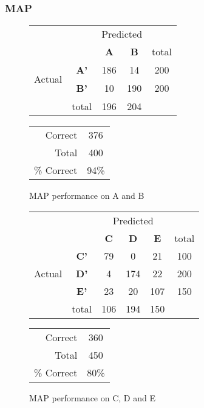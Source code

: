 \subsubsection{MAP}
\begin{figure}[!ht]
\begin{minipage}[b]{0.5\linewidth}
\centering
	\begin{tabular}{ccc|c|c}
	 & &\multicolumn{2}{c}{Predicted} &\\
	  & & \bf{A} &  \bf{B} & total \\
	 \cline{3-5}
	 \multirow{2}{*}{\begin{sideways}Actual\end{sideways}} & \bf{A'}& 186 & 14 & 200 \\
	 \cline{3-5}
	 & \bf{B'}& 10 & 190 & 200 \\
	  \cline{3-5}
	 &total&196&204&\\
	\end{tabular}
\end{minipage}
\hspace{0.5cm}
\begin{minipage}[b]{0.5\linewidth}
	\begin{tabular}{r|c}
	\hline
	Correct& 376\\
	Total& 400\\
	\hline
	\% Correct& 94\%\\
	\hline
	\end{tabular}
\end{minipage}
\vspace{1mm}
\caption{MAP performance on A and B}
\end{figure}


\begin{figure}[!ht]
\begin{minipage}[b]{0.5\linewidth}
\centering
	\begin{tabular}{ccc|c|c|c}
	 & &\multicolumn{3}{c}{Predicted} &\\
	  & & \bf{C} &  \bf{D} & \bf{E} & total \\
	 \cline{3-6}
	 \multirow{3}{*}{\begin{sideways}Actual\end{sideways}} & \bf{C'}& 79 & 0 & 21 & 100\\
	 \cline{3-6}
	 & \bf{D'}& 4 & 174 & 22 & 200\\
	  \cline{3-6}
	 & \bf{E'}& 23 & 20 & 107 &  150\\
	  \cline{3-6}
	 &total&106&194&150\\
	\end{tabular}
\end{minipage}
\hspace{0.5cm}
\begin{minipage}[b]{0.5\linewidth}
	\begin{tabular}{r|c}
	\hline
	Correct& 360\\
	Total& 450\\
	\hline
	\% Correct& 80\%\\
	\hline
	\end{tabular}
\end{minipage}
\vspace{1mm}
\caption{MAP performance on C, D and E}
\end{figure}

